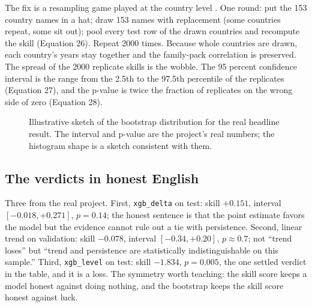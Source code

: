 \documentclass[11pt]{article}
\begin{document}
The fix is a resampling game played at the country level
\cite{efron1993bootstrap, cameron2008bootstrap}. One round: put the 153
country names in a hat; draw 153 names with replacement (some countries
repeat, some sit out); pool every test row of the drawn countries and
recompute the skill (Equation 26). Repeat 2000 times. Because whole
countries are drawn, each country's years stay together and the
family-pack correlation is preserved. The spread of the 2000 replicate
skills is the wobble. The 95 percent confidence interval is the range
from the 2.5th to the 97.5th percentile of the replicates (Equation 27),
and the p-value is twice the fraction of replicates on the wrong side of
zero (Equation 28).

\begin{figure}[ht]
\centering
{}
\caption{Illustrative sketch of the bootstrap distribution for the real
headline result. The interval and p-value are the project's real numbers;
the histogram shape is a sketch consistent with them.}
\label{fig:hist}
\end{figure}

\subsection{The verdicts in honest English}

Three from the real project. First, \texttt{xgb\_delta} on test: skill
$+0.151$, interval $[-0.018, +0.271]$, $p = 0.14$; the honest sentence is
that the point estimate favors the model but the evidence cannot rule
out a tie with persistence. Second, linear trend on validation: skill
$-0.078$, interval $[-0.34, +0.20]$, $p \approx 0.7$; not ``trend
loses'' but ``trend and persistence are statistically indistinguishable
on this sample.'' Third, \texttt{xgb\_level} on test: skill $-1.834$,
$p = 0.005$, the one settled verdict in the table, and it is a loss. The
symmetry worth teaching: the skill score keeps a model honest against
doing nothing, and the bootstrap keeps the skill score honest against
luck.
\end{document}
